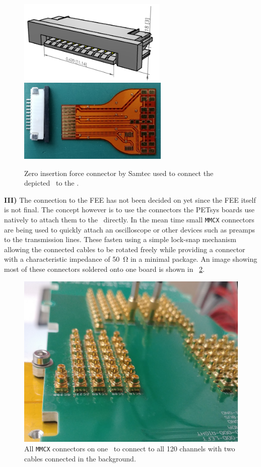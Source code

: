 \documentclass[../BTOF_summary.tex]{subfiles}
\begin{document}
\begin{figure}[htbp]
	\centering
	\includegraphics[height=4cm]{fig/SensorBoard_connector_drawing.png}
	\includegraphics[height=4cm]{fig/SensorBoard_connector.png}
	\caption{Zero insertion force connector by Samtec used to connect the depicted \sensorboard\ to the \railboard .}
	\label{fig:SensorBoard_connector}
\end{figure}

\textbf{III)} The connection to the FEE has not been decided on yet since the FEE itself is not final.
The concept however is to use the connectors the PETsys boards use natively to attach them to the \railboard\ directly.
In the mean time small \texttt{MMCX} connectors are being used to quickly attach an oscilloscope or other devices such as preamps to the transmission lines.
These fasten using a simple lock-snap mechanism allowing the connected cables to be rotated freely while providing a connector with a characteristic impedance of \SI{50}{\ohm} in a minimal package.
An image showing most of these connectors soldered onto one board is shown in \fig ~\ref{fig:MMCX_connectors}.

\begin{figure}[htbp]
	\centering
	\includegraphics[width=.7\textwidth]{fig/MMCX_crop.jpg}
	\caption{All \texttt{MMCX} connectors on one \railboard\ to connect to all 120 channels with two cables connected in the background.}
	\label{fig:MMCX_connectors}
\end{figure}
\end{document}
